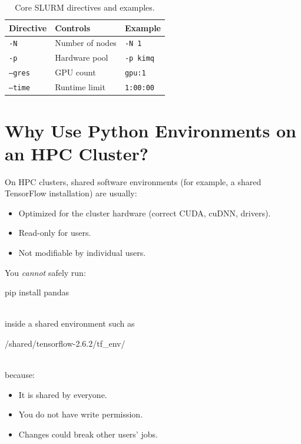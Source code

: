 \documentclass[11pt]{article}
\begin{document}
\begin{table}[ht]
\centering
\begin{tabular}{@{}lll@{}}
\toprule
Directive & Controls        & Example      \\
\midrule
\texttt{-N}      & Number of nodes  & \texttt{-N 1}      \\
\texttt{-p}      & Hardware pool    & \texttt{-p kimq}   \\
\texttt{--gres}  & GPU count        & \texttt{gpu:1}     \\
\texttt{--time}  & Runtime limit    & \texttt{1:00:00}   \\
\bottomrule
\end{tabular}
\caption{Core SLURM directives and examples.}
\label{tab:directives}
\end{table}

\section{Why Use Python Environments on an HPC Cluster?}
\label{sec:why-env}

On HPC clusters, shared software environments (for example, a shared TensorFlow installation) are usually:

\begin{itemize}
  \item Optimized for the cluster hardware (correct CUDA, cuDNN, drivers).
  \item Read-only for users.
  \item Not modifiable by individual users.
\end{itemize}

You \emph{cannot} safely run:\\
\begin{codeblock}
pip install pandas
\end{codeblock}\\
inside a shared environment such as\\
\begin{codeblock}
 /shared/tensorflow-2.6.2/tf_env/
\end{codeblock}
\\because:

\begin{itemize}
  \item It is shared by everyone.
  \item You do not have write permission.
  \item Changes could break other users' jobs.
\end{itemize}
\end{document}
